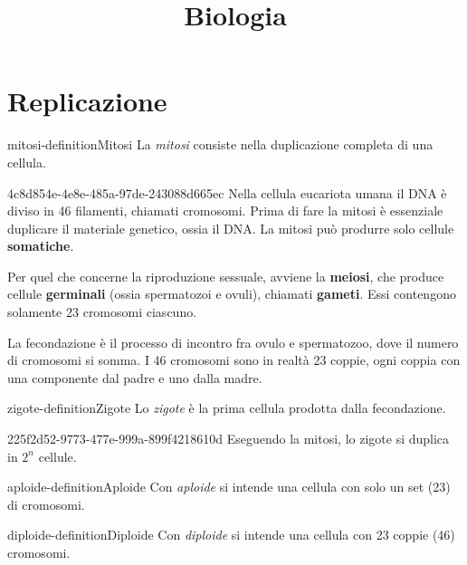 \documentclass[preview]{standalone}
\begin{document}
\title{Biologia}
\genpage

\section{Replicazione}

\begin{snippetdefinition}{mitosi-definition}{Mitosi}
    La \textit{mitosi} consiste nella duplicazione completa di una cellula.
\end{snippetdefinition}

\begin{snippet}{4c8d854e-4e8e-485a-97de-243088d665ec}
    Nella cellula eucariota umana il DNA è diviso in 46 filamenti, chiamati cromosomi.
    Prima di fare la mitosi è essenziale duplicare il materiale genetico, ossia il DNA.
    La mitosi può produrre solo cellule \textbf{somatiche}.

    Per quel che concerne la riproduzione sessuale,
    avviene la \textbf{meiosi}, che produce cellule \textbf{germinali}
    (ossia spermatozoi e ovuli), chiamati \textbf{gameti}.
    Essi contengono solamente 23 cromosomi ciascuno.

    La fecondazione è il processo di incontro fra ovulo e spermatozoo,
    dove il numero di cromosomi si somma.
    I 46 cromosomi sono in realtà 23 coppie, ogni coppia con una componente dal padre e uno dalla madre.
\end{snippet}

\begin{snippetdefinition}{zigote-definition}{Zigote}
    Lo \textit{zigote} è la prima cellula prodotta dalla fecondazione.
\end{snippetdefinition}

\begin{snippet}{225f2d52-9773-477e-999a-899f4218610d}
    Eseguendo la mitosi, lo zigote si duplica in \(2^n\) cellule.
\end{snippet}

\begin{snippetdefinition}{aploide-definition}{Aploide}
    Con \textit{aploide} si intende una cellula con solo un set (23) di cromosomi.
\end{snippetdefinition}


\begin{snippetdefinition}{diploide-definition}{Diploide}
    Con \textit{diploide} si intende una cellula con 23 coppie (46) cromosomi.
\end{snippetdefinition}
\end{document}
